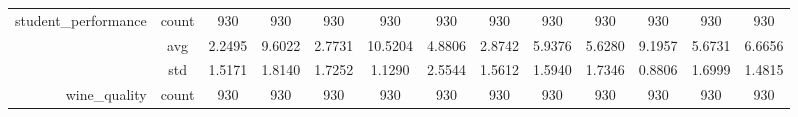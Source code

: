 \begin{table}[htbp]
{\begin{tabular}{rcccccccccccc}
                  student\_performance               & count                                  & 930                                                                                & 930                                                                       & 930                                                                       & 930                                                                       & 930                                           & 930                                         & 930                                            & 930                                            & 930                                            & 930                                            & 930                                            \\
                                                     & avg                                    & \cellcolor[rgb]{ .776,  .937,  .808}\textcolor[rgb]{ 0,  .38,  0}{2.2495}          & 9.6022                                                                    & 2.7731                                                                    & 10.5204                                                                   & 4.8806                                        & 2.8742                                      & 5.9376                                         & 5.6280                                         & 9.1957                                         & 5.6731                                         & 6.6656                                         \\
                                                     & std                                    & 1.5171                                                                             & 1.8140                                                                    & 1.7252                                                                    & 1.1290                                                                    & 2.5544                                        & 1.5612                                      & 1.5940                                         & 1.7346                                         & 0.8806                                         & 1.6999                                         & 1.4815                                         \\
                  wine\_quality                      & count                                  & 930                                                                                & 930                                                                       & 930                                                                       & 930                                                                       & 930                                           & 930                                         & 930                                            & 930                                            & 930                                            & 930                                            & 930                                            \\

\end{tabular}}
\end{table}
